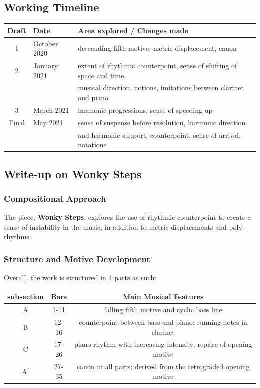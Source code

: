 \documentclass{article}
\begin{document}
\newpage

\subsection{Working Timeline}
\begin{center}
	\def\arraystretch{1.5}
\begin{tabular}{|c|l|l|}
	\hline
	Draft&Date&Area explored / Changes made\\
	\hline
	1&October 2020&
    descending fifth motive, metric displacement, canon\\
	\hline
	2&
    January 2021&extent of rhythmic counterpoint, sense of shifting of space and time,\\
    &&musical direction, notions, imitations between clarinet and piano\\
	\hline
	3&March 2021&harmonic progressions, sense of speeding up\\
	\hline
	Final&May 2021&sense of suspense before resolution, harmonic direction\\
    &&and harmonic support, counterpoint, sense of arrival, notations\\
	\hline
\end{tabular}
\end{center}

\subsection{Write-up on {\bf Wonky Steps}}

\subsubsection{Compositional Approach}
The piece, {\bf Wonky Steps}, explores the use of rhythmic counterpoint to
create a sense of instability in the music, in addition to metric displacements
and poly-rhythms.\\

\subsubsection{Structure and Motive Development}
Overall, the work is structured in 4 parts as such:\\

\begin{center}
	\def\arraystretch{1.5}
\begin{tabular}{|c|c|c|}
	\hline
	subsection&Bars&Main Musical Features\\
	\hline
	A&1-11&falling fifth motive and cyclic bass line\\
	\hline
	B&12-16&counterpoint between bass and piano; running notes in clarinet\\
	\hline
	C&17-26&piano rhythm with increasing intensity; reprise of opening motive\\
	\hline
	A\(^\prime\)&27-35&canon in all parts; derived from the retrograded opening motive\\
	\hline
\end{tabular}
\end{center}
\end{document}
